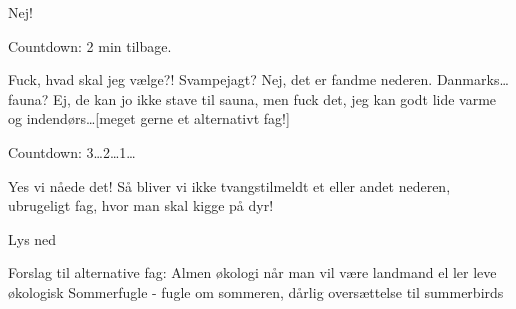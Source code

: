 \documentclass[a4paper,11pt]{article}
\begin{document}
\begin{sketch}
 Nej! 

Countdown: 2 min tilbage. 

 Fuck, hvad skal jeg vælge?! Svampejagt? Nej, det er fandme nederen. Danmarks\ldots fauna? Ej, de kan jo ikke stave til sauna, men fuck det, jeg kan godt lide varme og indendørs\ldots [meget gerne et alternativt fag!] 

 Countdown: 3\ldots 2\ldots 1\ldots

 Yes vi nåede det! Så bliver vi ikke tvangstilmeldt et eller andet nederen, ubrugeligt fag, hvor man skal kigge på dyr!

\scene Lys ned

\scene Forslag til alternative fag: Almen økologi når man vil
være landmand el ler leve økologisk Sommerfugle - fugle om sommeren,
dårlig oversættelse til summerbirds

\end{sketch}
\end{document}
